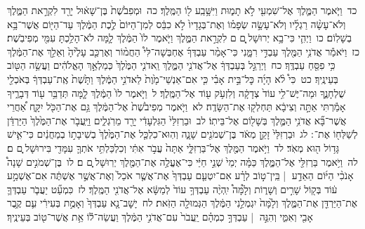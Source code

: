 \documentclass[18pt]{article}
\newcommand{\kri}[1]{\Afootnote{#1}}	%
\begin{document}
 {\loc כד~}וַיֹּ֧אמֶר הַמֶּ֛לֶךְ אֶל־שִׁמְעִ֖י לֹ֣א תָמ֑וּת וַיִּשָּׁ֥בַֽע ל֖וֹ הַמֶּֽלֶךְ׃ \startlock
 {\loc כה~}וּמְפִבֹ֙שֶׁת֙ בֶּן־שָׁא֔וּל יָרַ֖ד לִקְרַ֣את הַמֶּ֑לֶךְ וְלֹא־עָשָׂ֨ה רַגְלָ֜יו וְלֹא־עָשָׂ֣ה שְׂפָמ֗וֹ וְאֶת־בְּגָדָיו֙ לֹ֣א כִבֵּ֔ס לְמִן־הַיּוֹם֙ לֶ֣כֶת הַמֶּ֔לֶךְ עַד־הַיּ֖וֹם אֲשֶׁר־בָּ֥א בְשָׁלֽוֹם׃ \startlock
 {\loc כו~}וַיְהִ֛י כִּי־בָ֥א יְרוּשָׁל ַ֖͏ְם ם לִקְרַ֣את הַמֶּ֑לֶךְ וַיֹּ֤אמֶר לוֹ֙ הַמֶּ֔לֶךְ לָ֛מָּה לֹא־הָלַ֥כְתָּ עִמִּ֖י מְפִיבֹֽשֶׁת׃ \startlock
 {\loc כז~}וַיֹּאמַ֕ר אֲדֹנִ֥י הַמֶּ֖לֶךְ עַבְדִּ֣י רִמָּ֑נִי כִּי־אָמַ֨ר עַבְדְּךָ֜ אֶחְבְּשָׁה־לִּי֩ הַחֲמ֨וֹר וְאֶרְכַּ֤ב עָלֶ֙יהָ֙ וְאֵלֵ֣ךְ אֶת־הַמֶּ֔לֶךְ כִּ֥י פִסֵּ֖חַ עַבְדֶּֽךָ׃ \startlock
 {\loc כח~}וַיְרַגֵּ֣ל בְּעַבְדְּךָ֔ אֶל־אֲדֹנִ֖י הַמֶּ֑לֶךְ וַֽאדֹנִ֤י הַמֶּ֙לֶךְ֙ כְּמַלְאַ֣ךְ הָאֱלֹהִ֔ים וַעֲשֵׂ֥ה הַטּ֖וֹב בְּעֵינֶֽיךָ׃ \startlock
 {\loc כט~}כִּי֩ לֹ֨א הָיָ֜ה כׇּל־בֵּ֣ית אָבִ֗י כִּ֤י אִם־אַנְשֵׁי־מָ֙וֶת֙ לַאדֹנִ֣י הַמֶּ֔לֶךְ וַתָּ֙שֶׁת֙ אֶֽת־עַבְדְּךָ֔ בְּאֹכְלֵ֖י שֻׁלְחָנֶ֑ךָ וּמַה־יֶּשׁ־לִ֥י עוֹד֙ צְדָקָ֔ה וְלִזְעֹ֥ק ע֖וֹד אֶל־הַמֶּֽלֶךְ׃ \startlock
 {\loc ל~}וַיֹּ֤אמֶר לוֹ֙ הַמֶּ֔לֶךְ לָ֛מָּה תְּדַבֵּ֥ר ע֖וֹד דְּבָרֶ֑יךָ אָמַ֕רְתִּי אַתָּ֣ה וְצִיבָ֔א תַּחְלְק֖וּ אֶת־הַשָּׂדֶֽה׃ \startlock
 {\loc לא~}וַיֹּ֤אמֶר מְפִיבֹ֙שֶׁת֙ אֶל־הַמֶּ֔לֶךְ גַּ֥ם אֶת־הַכֹּ֖ל יִקָּ֑ח אַ֠חֲרֵי אֲשֶׁר־בָּ֞א אֲדֹנִ֥י הַמֶּ֛לֶךְ בְּשָׁל֖וֹם אֶל־בֵּיתֽוֹ׃ \startlock
 {\loc לב~}וּבַרְזִלַּי֙ הַגִּלְעָדִ֔י יָרַ֖ד מֵרֹֽגְלִ֑ים וַיַּֽעֲבֹ֤ר אֶת־הַמֶּ֙לֶךְ֙ הַיַּרְדֵּ֔ן לְשַׁלְּח֖וֹ אֶת־ \edtext{(בירדן)}{\kri{קרי: הַיַּרְדֵּֽן}} ׃ \startlock
 {\loc לג~}וּבַרְזִלַּי֙ זָקֵ֣ן מְאֹ֔ד בֶּן־שְׁמֹנִ֖ים שָׁנָ֑ה וְהֽוּא־כִלְכַּ֤ל אֶת־הַמֶּ֙לֶךְ֙ בְשִׁיבָת֣וֹ בְמַחֲנַ֔יִם כִּי־אִ֛ישׁ גָּד֥וֹל ה֖וּא מְאֹֽד׃ \startlock
 {\loc לד~}וַיֹּ֥אמֶר הַמֶּ֖לֶךְ אֶל־בַּרְזִלָּ֑י אַתָּה֙ עֲבֹ֣ר אִתִּ֔י וְכִלְכַּלְתִּ֥י אֹתְךָ֛ עִמָּדִ֖י בִּירוּשָׁל ָֽ͏ְם ם׃ \startlock
 {\loc לה~}וַיֹּ֥אמֶר בַּרְזִלַּ֖י אֶל־הַמֶּ֑לֶךְ כַּמָּ֗ה יְמֵי֙ שְׁנֵ֣י חַיַּ֔י כִּי־אֶעֱלֶ֥ה אֶת־הַמֶּ֖לֶךְ יְרֽוּשָׁל ָֽ͏ְם ם׃ \startlock
 {\loc לו~}בֶּן־שְׁמֹנִ֣ים שָׁנָה֩ אָנֹכִ֨י הַיּ֜וֹם הַאֵדַ֣ע  |  בֵּֽין־ט֣וֹב לְרָ֗ע אִם־יִטְעַ֤ם עַבְדְּךָ֙ אֶת־אֲשֶׁ֤ר אֹכַל֙ וְאֶת־אֲשֶׁ֣ר אֶשְׁתֶּ֔ה אִם־אֶשְׁמַ֣ע ע֔וֹד בְּק֖וֹל שָׁרִ֣ים וְשָׁר֑וֹת וְלָ֩מָּה֩ יִֽהְיֶ֨ה עַבְדְּךָ֥ עוֹד֙ לְמַשָּׂ֔א אֶל־אֲדֹנִ֖י הַמֶּֽלֶךְ׃ \startlock
 {\loc לז~}כִּמְעַ֞ט יַעֲבֹ֧ר עַבְדְּךָ֛ אֶת־הַיַּרְדֵּ֖ן אֶת־הַמֶּ֑לֶךְ וְלָ֙מָּה֙ יִגְמְלֵ֣נִי הַמֶּ֔לֶךְ הַגְּמוּלָ֖ה הַזֹּֽאת׃ \startlock
 {\loc לח~}יָשׇׁב־נָ֤א עַבְדְּךָ֙ וְאָמֻ֣ת בְּעִירִ֔י עִ֛ם קֶ֥בֶר אָבִ֖י וְאִמִּ֑י וְהִנֵּ֣ה  |  עַבְדְּךָ֣ כִמְהָ֗ם יַֽעֲבֹר֙ עִם־אֲדֹנִ֣י הַמֶּ֔לֶךְ וַעֲשֵׂה־ל֕וֹ אֵ֥ת אֲשֶׁר־ט֖וֹב בְּעֵינֶֽיךָ׃ \startlock
\end{document}
